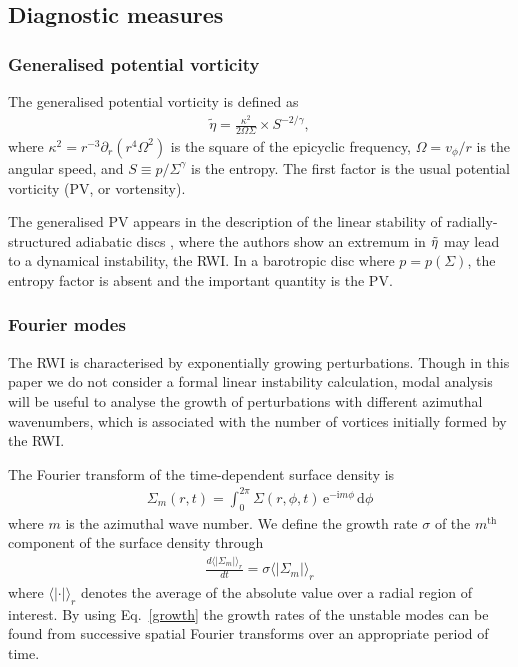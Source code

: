 \subsection{Diagnostic measures}

\subsubsection{Generalised potential vorticity}

The generalised potential vorticity is defined as
\begin{align}
  \tilde{\eta} = \frac{\kappa^2}{2\Omega\Sigma}\times S^{-2/\gamma}, 
\end{align}
where $\kappa^2 = r^{-3}\partial_r(r^4\Omega^2)$ is the square of the
epicyclic frequency, $\Omega=v_\phi/r$ is the angular speed, and
$S\equiv p/\Sigma^\gamma$ is the entropy. The first factor is the
usual potential vorticity (PV, or vortensity). 

The generalised PV appears in the description of the linear stability
of radially-structured adiabatic discs \citep{lovelace99,li00}, where
the authors show an extremum in $\tilde{\eta}$ may lead to a dynamical
instability, the RWI. In a barotropic disc where $p=p(\Sigma)$, the entropy factor is 
absent and the important quantity is the PV. 

\subsubsection{Fourier modes} 
The RWI is characterised by exponentially
growing perturbations. Though in this paper we do not consider a
formal linear instability calculation, modal analysis will be useful
to analyse the growth of perturbations with different azimuthal
wavenumbers, which is associated with the number of vortices initially
formed by the RWI.    

The Fourier transform of the time-dependent surface density is
\begin{align}\label{fouriertransform}
  \Sigma_m(r,t) = \int_{0}^{2\pi}
  \Sigma(r,\phi,t) \, \mathrm{e}^{-\mathrm{i}m\phi} \, \mathrm{d}\phi 
\end{align} 
where $m$ is the azimuthal wave number. We define the growth rate
$\sigma$ of the $m^\mathrm{th}$ component of the surface density
through 
\begin{align}\label{growth}
  \frac{d \langle|\Sigma_m|\rangle_r }{dt}= \sigma \langle|\Sigma_m|\rangle_r 
\end{align}
where %
$\langle|\cdot|\rangle_r$ denotes the average of the absolute value
over a radial region of interest. By using Eq.~\ref{growth} the growth
rates of the unstable modes can be found from successive spatial
Fourier transforms over an appropriate period of time. 

